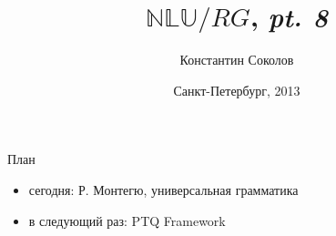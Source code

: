 \documentclass{beamer}
\begin{document}
\title{\huge{$\mathbb{NLU}/RG$, \textit{pt. 8}}}
\author{Константин Соколов}
\date{Санкт-Петербург, 2013} 
\begin{frame}
    \thispagestyle{empty}
    \titlepage
\end{frame}

\begin{frame}{План}
    \setcounter{framenumber}{1}
    \begin{itemize}
        \item сегодня: Р. Монтегю, универсальная грамматика
        \item в следующий раз: PTQ Framework
    \end{itemize}
\end{frame}



\end{document}
